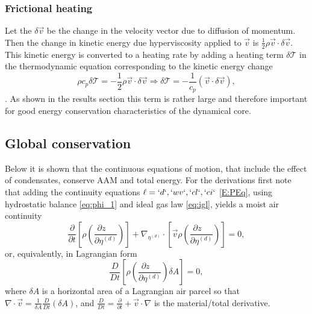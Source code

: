 \documentclass{agujournal}
\begin{document}
{\subsubsection{Frictional heating}\label{sec:frictional_heating}
Let the $\delta \vec{v}$ be the change in the velocity vector due to diffusion of momentum. Then the change in kinetic energy due hyperviscosity applied to $\vec{v}$ is $\frac{1}{2}\rho \vec{v} \cdot \delta \vec{v}$. This kinetic energy is converted to a heating rate by adding a heating term $\delta \mathcal{T}$ in the thermodynamic equation corresponding to the kinetic energy change
\begin{equation}
\rho c_p \delta \mathcal{T}=-\frac{1}{2}\rho \vec{v} \cdot \delta \vec{v} \Rightarrow
 \delta \mathcal{T}=-\frac{1}{c_p}\left(\vec{v}\cdot \delta \vec{v}\right),\label{eq:tcp}
\end{equation}
\citep[p.71 in ][]{CAM5}. As shown in the results section this term is rather large and therefore important for good energy conservation characteristics of the dynamical core.
\subsection{Global conservation}\label{sec:aam}
Below it is shown that the continuous equations of motion, that include the effect of condensates, conserve AAM and total energy. For the derivations first note that adding the continuity equations $\ell=`d`,`wv`,`cl`,`ci`$ \eqref{E:PEq}, using hydrostatic balance \eqref{eq:phi_1} and ideal gas law \eqref{eq:igl}, yields a moist air continuity
\begin{equation}
\frac{\partial }{\partial t}\left[ \rho \left(\frac{\partial z\quad}{\partial \eta^{(d)}}\right)\right]+\nabla_{\eta^{(d)}} \cdot \left[ \vec{v}\rho  \left( \frac{\partial z\quad }{\partial \eta^{(d)}}\right)\right]=0,\label{eq:cont2}
\end{equation}
or, equivalently, in Lagrangian form
\begin{equation}
\frac{D}{Dt}\left[ \rho \left( \frac{\partial z\quad }{\partial \eta^{(d)}}\right)\delta A\right]=0,\label{eq:lagra_cont}
\end{equation}
where $\delta A$ is a horizontal area of a Lagrangian air parcel so that $\nabla \cdot \vec{v}=\frac{1}{\delta A}\frac{D}{Dt}\left( \delta A\right)$, and  $\frac{D}{Dt}=\frac{\partial }{\partial t}+\vec{v}\cdot \nabla $ is the material/total derivative. 
}
\end{document}
